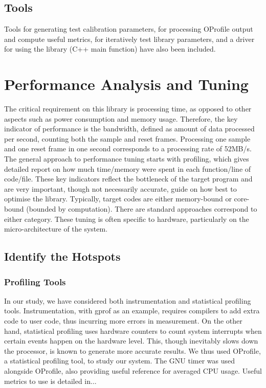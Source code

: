 \documentclass[journal]{IEEEtran}
\begin{document}
\subsection{Tools}
Tools for generating test calibration parameters, for processing OProfile output and compute useful metrics, for iteratively test library parameters, and a driver for using the library (C++ main function) have also been included.

\section{Performance Analysis and Tuning} %
The critical requirement on this library is processing time, as opposed to other aspects such as power consumption and memory usage. Therefore, the key indicator of performance is the bandwidth, defined as amount of data processed per second, counting both the sample and reset frames. Processing one sample and one reset frame in one second corresponds to a processing rate of 52MB/s. The general approach to performance tuning starts with profiling, which gives detailed report on how much time/memory were spent in each function/line of code/file. These key indicators reflect the bottleneck of the target program and are very important, though not necessarily accurate, guide on how best to optimise the library. Typically, target codes are either memory-bound or core-bound (bounded by computation). There are standard approaches correspond to either category. These tuning is often specific to hardware, particularly on the micro-architecture of the system.
\subsection{Identify the Hotspots}
\subsubsection{Profiling Tools}
In our study, we have considered both instrumentation and statistical profiling tools. Instrumentation, with gprof as an example, requires compilers to add extra code to user code, thus incurring more errors in measurement. On the other hand, statistical profiling uses hardware counters to count system interrupts when certain events happen on the hardware level. This, though inevitably slows down the processor, is known to generate more accurate results. We thus used OProfile, a statistical profiling tool, to study our system. The GNU timer was used alongside OProfile, also providing useful reference for averaged CPU usage. Useful metrics to use is detailed in...
\end{document}
